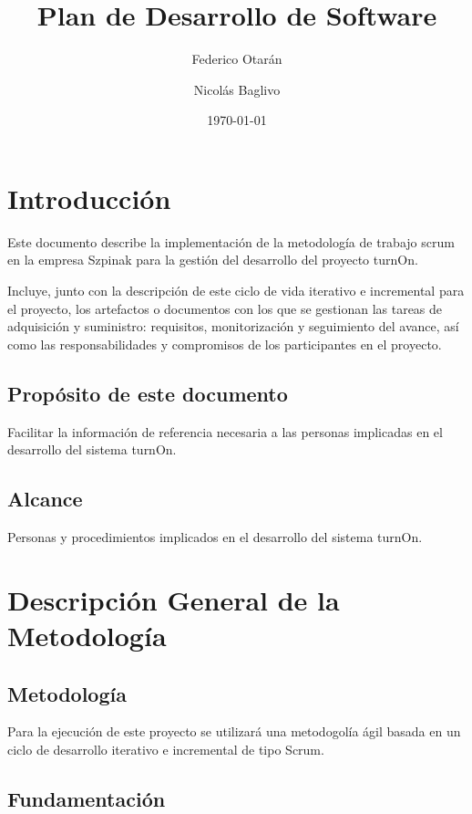 \documentclass[a4paper,oneside,10pt]{article}
\begin{document}

\title{Plan de Desarrollo de Software}
\author{Federico Otar\'an \and Nicol\'as Baglivo}
\date{\today}
\maketitle

\tableofcontents

\section{Introducción}

Este documento describe la implementación de la metodología de trabajo scrum en la empresa Szpinak para la gestión del desarrollo del proyecto turnOn.

Incluye, junto con la descripción de este ciclo de vida iterativo e incremental para el proyecto, los artefactos o documentos con los que se gestionan las tareas de adquisición y suministro: requisitos, monitorización y seguimiento del avance, así como las responsabilidades y compromisos de los participantes en el proyecto.

\subsection{Propósito de este documento}

Facilitar la información de referencia necesaria a las personas implicadas en el desarrollo del sistema turnOn.

\subsection{Alcance}

Personas y procedimientos implicados en el desarrollo del sistema turnOn.

                  
\section{Descripción General de la Metodología}

\subsection{Metodolog\'ia}
Para la ejecución de este proyecto se utilizar\'a una metodogol\'ia \'agil basada en un ciclo de desarrollo iterativo e incremental de tipo Scrum.

\subsection{Fundamentación}
\end{document}

